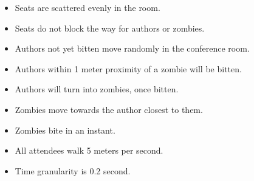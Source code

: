 \begin{itemize}[itemsep=1mm]\parskip=0pt
\item[] Seats are scattered evenly in the room.
\item[] Seats do not block the way for authors or zombies.
\item[] Authors not yet bitten move randomly in the conference room.
\item[] Authors within 1 meter proximity of a zombie will be bitten.
\item[] Authors will turn into zombies, once bitten.
\item[] Zombies move towards the author closest to them.
\item[] Zombies bite in an instant.
\item[] All attendees walk 5 meters per second.
\item[] Time granularity is 0.2 second.
\end{itemize}
